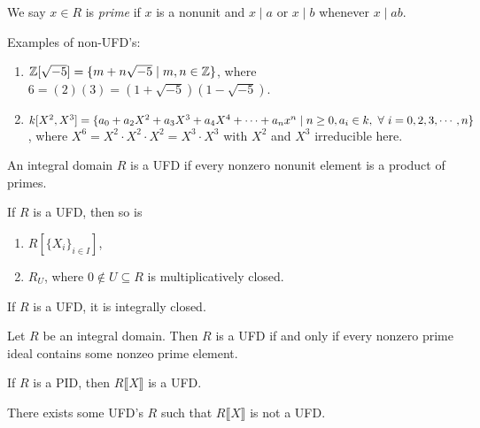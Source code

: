 \begin{definition}
    We say $x \in R$ is \emph{prime} if $x$ is a nonunit and $x \mid a$ or $x \mid b$ whenever $x \mid ab$.
\end{definition}

\begin{example}
    Examples of non-UFD's:
    \begin{enumerate}
        \item 
            $\mathbb{Z}[\sqrt{-5}] = \{m+n\sqrt{-5} \mid m,n \in \mathbb{Z}\}$, where $6 = (2)(3) = (1+\sqrt {-5})(1-\sqrt{-5})$.
        \item
            $k[X^{2},X^{3}] = \{a_0+a_2X^{2}+a_3X^{3}+a_4X^{4}+\cdots + a_nx^{n} \mid n \geq 0, a_i \in k,\ \forall \  i = 0,2,3,\cdots,n\}$, where $X^{6} = X^{2} \cdot X^{2} \cdot X^{2} = X^{3} \cdot X^{3}$ with $X^{2}$ and $X^{3}$ irreducible here.
    \end{enumerate}
\end{example}

\begin{definition}
    An integral domain $R$ is a UFD if every nonzero nonunit element is a product of primes.
\end{definition}

\begin{theorem}
    If $R$ is a UFD, then so is 
    \begin{enumerate}
        \item $R[\{X_i\}_{i \in I}]$,
        \item $R_U$, where $0 \not \in U \subseteq R$ is multiplicatively closed.
    \end{enumerate}
\end{theorem}

\begin{fact}
    If $R$ is a UFD, it is integrally closed.
\end{fact}

\begin{theorem}
    Let $R$ be an integral domain. Then $R$ is a UFD if and only if every nonzero prime ideal contains some nonzeo prime element.
\end{theorem}

\begin{theorem}
    If $R$ is a PID, then $R\llbracket X \rrbracket$ is a UFD.
\end{theorem}

\begin{example}
    There exists some UFD's $R$ such that $R\llbracket X \rrbracket $ is not a UFD.
\end{example}

